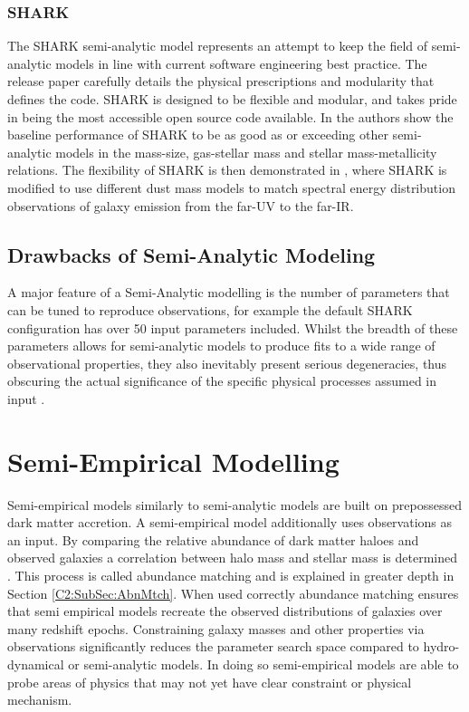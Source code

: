 \subsubsection{SHARK}
The SHARK semi-analytic model represents an attempt to keep the field of semi-analytic models in line with current software engineering best practice. The release paper \citep{Lagos2018Shark:Formation} carefully details the physical prescriptions and modularity that defines the code. SHARK is designed to be flexible and modular, and takes pride in being the most accessible open source code available. In \citet{Lagos2018Shark:Formation} the authors show the baseline performance of SHARK to be as good as or exceeding other semi-analytic models in the mass-size, gas-stellar mass and stellar mass-metallicity relations. The flexibility of SHARK is then demonstrated in \citet{Lagos2019FromModel}, where  SHARK is modified to use different dust mass models to match spectral energy distribution observations of galaxy emission from the far-UV to the far-IR.

\subsection{Drawbacks of Semi-Analytic Modeling}
A major feature of a Semi-Analytic modelling is the number of parameters that can be tuned to reproduce observations, for example the default SHARK configuration has over 50 input parameters included. Whilst the breadth of these parameters allows for semi-analytic models to produce fits to a wide range of observational properties, they also inevitably present serious degeneracies, thus obscuring the actual significance of the specific physical processes assumed in input \citep{Lapi2011DarkModels,Gonzalez2011Evolution4}.


\section{Semi-Empirical Modelling}
\label{sec:SEM}
Semi-empirical models similarly to semi-analytic models are built on prepossessed dark matter accretion. A semi-empirical model additionally uses observations as an input. By comparing the relative abundance of dark matter haloes and observed galaxies a correlation between halo mass and stellar mass is determined \citep{Kravtsov2004TheDistribution,Shankar2006NewFormation}. This process is called abundance matching and is explained in greater depth in Section \ref{C2:SubSec:AbnMtch}. When used correctly abundance matching ensures that semi empirical models recreate the observed distributions of galaxies over many redshift epochs. Constraining galaxy masses and other properties via observations significantly reduces the parameter search space compared to hydro-dynamical or semi-analytic models. In doing so semi-empirical models are able to probe areas of physics that may not yet have clear constraint or physical mechanism.

